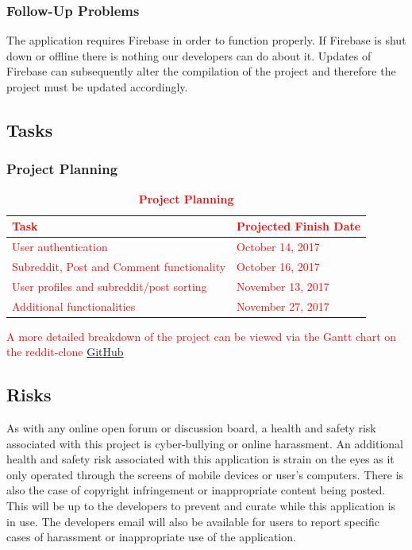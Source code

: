 \documentclass[12pt,fleqn]{article}
\begin{document}
\subsubsection {Follow-Up Problems}
The application requires Firebase in order to function properly. If Firebase is shut down or offline there is nothing our developers can do about it.  Updates of Firebase can subsequently alter the compilation of the project and therefore the project must be updated accordingly.  

\subsection {Tasks}

\subsubsection{Project Planning}

\begin{table}[H]
\caption{\bf Project Planning }
\textcolor{red}{\begin{tabularx}{\textwidth}{p{10cm}X}
\toprule {\bf Task} & {\bf Projected Finish Date}\\
\midrule
User authentication & October 14, 2017 \\
Subreddit, Post and Comment functionality & October 16, 2017 \\
User profiles and subreddit/post sorting & November 13, 2017 \\
Additional functionalities & November 27, 2017 \\
\bottomrule
\end{tabularx}}
\end{table}

\textcolor{red}{A more detailed breakdown of the project can be viewed via the Gantt chart on the reddit-clone \href{https://gitlab.cas.mcmaster.ca/trudeaua/reddit-clone.git}{GitHub}}

\subsection {Risks}
As with any online open forum or discussion board, a health and safety risk associated with this project is cyber-bullying or online harassment. An additional health and safety risk associated with this application is strain on the eyes as it only operated through the screens of mobile devices or user's computers. There is also the case of copyright infringement or inappropriate content being posted. This will be up to the developers to prevent and curate while this application is in use.  The developers email will also be available for users to report specific cases of harassment or inappropriate use of the application. \\
\end{document}

